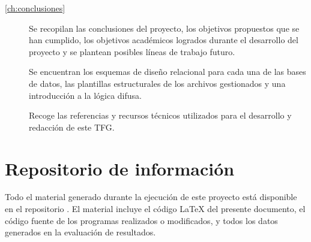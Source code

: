 \begin{description}
    \item[\autoref{ch:conclusiones}] Se recopilan las conclusiones del proyecto, los objetivos propuestos que se han cumplido, los objetivos académicos logrados durante el desarrollo del proyecto y se plantean posibles líneas de trabajo futuro.
    \item[] Se encuentran los esquemas de diseño relacional para cada una de las bases de datos, las plantillas estructurales de los archivos gestionados y una introducción a la lógica difusa.
    \item[] Recoge las referencias y recursos técnicos utilizados para el desarrollo y redacción de este \acrshort{TFG}.
\end{description}

\section{Repositorio de información}
\label{sec:repositorio}


Todo el material generado durante la ejecución de este proyecto está disponible en el repositorio \thegitrepo{}.  El material incluye el código \LaTeX{} del presente documento, el código fuente de los programas realizados o modificados, y todos los datos generados en la evaluación de resultados.